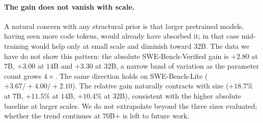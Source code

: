 \paragraph{The gain does not vanish with scale.}
A natural concern with any structural prior is that larger pretrained
models, having seen more code tokens, would already have absorbed it; in
that case mid-training would help only at small scale and diminish toward
$32$B. The data we have do not show this pattern: the absolute
SWE-Bench-Verified gain is $+2.80$ at $7$B, $+3.00$ at $14$B and $+3.30$
at $32$B, a narrow band of variation as the parameter count grows
$4{\times}$. The same direction holds on SWE-Bench-Lite
($+3.67/+4.00/+2.10$). The relative gain naturally contracts with size
($+18.7\%$ at $7$B, $+11.5\%$ at $14$B, $+10.4\%$ at $32$B), consistent
with the higher absolute baseline at larger scales. We do not extrapolate
beyond the three sizes evaluated; whether the trend continues at $70$B+
is left to future work.